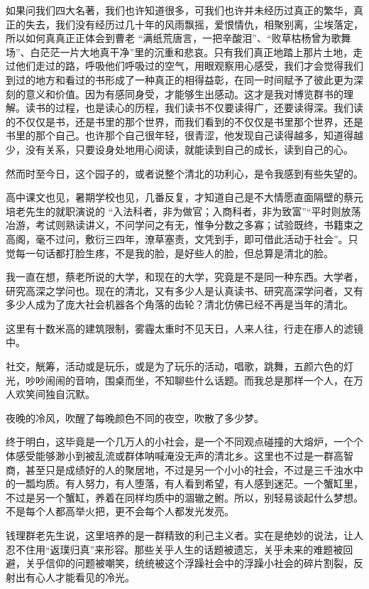 \documentclass[openany,scheme = chinese, linespread = 1.5]{ctexbook}
\begin{document}
如果问我们四大名著，我们也许知道很多，可我们也许并未经历过真正的繁华，真正的失去，我们没有经历过几十年的风雨飘摇，爱恨情仇，相聚别离，尘埃落定，所以如何真真正正体会到曹老 “满纸荒唐言，一把辛酸泪”、“败草枯杨曾为歌舞场”、白茫茫一片大地真干净”里的沉重和悲哀。只有我们真正地踏上那片土地，走过他们走过的路，呼吸他们呼吸过的空气，用眼观察用心感受，我们才会觉得我们到过的地方和看过的书形成了一种真正的相得益彰，在同一时间赋予了彼此更为深刻的意义和价值。因为有感同身受，才能够生出感动。这才是我对博览群书的理解。读书的过程，也是读心的历程，我们读书不仅要读得广，还要读得深。我们读的不仅仅是书，还是书里的那个世界，而我们看到的不仅仅是书里那个世界，还是书里的那个自己。也许那个自己很年轻，很青涩，他发现自己读得越多，知道得越少，没有关系，只要设身处地用心阅读，就能读到自己的成长，读到自己的心。

然而时至今日，这个园子的，或者说整个清北的功利心，是令我感到有些失望的。

高中课文也见，暑期学校也见，几番反复，才知道自己是不大情愿直面隔壁的蔡元培老先生的就职演说的 “入法科者，非为做官；入商科者，非为致富”“平时则放荡冶游，考试则熟读讲义，不问学问之有无，惟争分数之多寡；试验既终，书籍束之高阁，毫不过问，敷衍三四年，潦草塞责，文凭到手，即可借此活动于社会”。只觉每一句话都打脸生疼，不是我的脸，是好些人的脸，但总算是清北的脸。

我一直在想，蔡老所说的大学，和现在的大学，究竟是不是同一种东西。大学者，研究高深之学问也。现在的清北，又有多少人是认真读书、研究高深学问者，又有多少人成为了庞大社会机器各个角落的齿轮？清北仿佛已经不再是当年的清北。

这里有十数米高的建筑限制，雾霾太重时不见天日，人来人往，行走在瘆人的滤镜中。

社交，觥筹，活动或是玩乐，或是为了玩乐的活动，唱歌，跳舞，五颜六色的灯光，吵吵闹闹的音响，围桌而坐，不知聊些什么话题。而我总是那样一个人，在万人欢笑间独自沉默。

夜晚的冷风，吹醒了每晚颜色不同的夜空，吹散了多少梦。

终于明白，这毕竟是一个几万人的小社会，是一个不同观点碰撞的大熔炉，一个个体感受能够渺小到被乱流或群体呐喊淹没无声的清北乡。这里也不过是一群高智商，甚至只是成绩好的人的聚居地，不过是另一个小小的社会，不过是三千浊水中的一瓢均质。有人努力，有人堕落，有人看到希望，有人感到迷茫。一个蟹缸里，不过是另一个蟹缸，养着在同样均质中的涸辙之鲋。所以，别轻易谈起什么梦想。不是每个人都高举火把，更不会每个人都发光发亮。

钱理群老先生说，这里培养的是一群精致的利己主义者。实在是绝妙的说法，让人忍不住用“返璞归真”来形容。那些关乎人生的话题被遗忘，关乎未来的难题被回避，关乎信仰的问题被嘲笑，统统被这个浮躁社会中的浮躁小社会的碎片割裂，反射出有心人才能看见的冷光。
\end{document}
